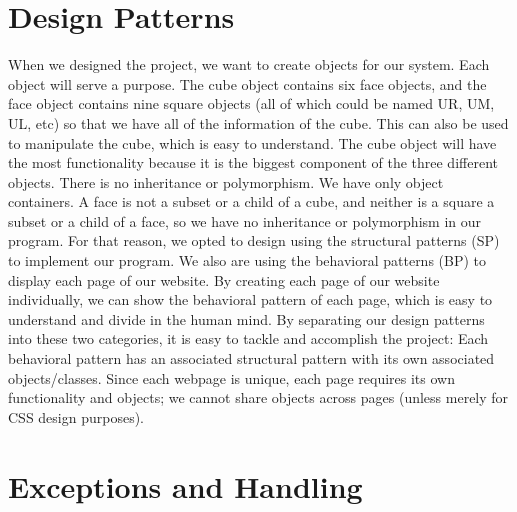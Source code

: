 \documentclass[12pt]{article}
\begin{document}
\section{Design Patterns}
\par
When we designed the project, we want to create objects for our system. Each object will serve a purpose. The cube object contains six face objects, and the face object contains nine square objects (all of which could be named UR, UM, UL, etc) so that we have all of the information of the cube. This can also be used to manipulate the cube, which is easy to understand. The cube object will have the most functionality because it is the biggest component of the three different objects. There is no inheritance or polymorphism. We have only object containers. A face is not a subset or a child of a cube, and neither is a square a subset or a child of a face, so we have no inheritance or polymorphism in our program. For that reason, we opted to design using the structural patterns (SP) to implement our program. We also are using the behavioral patterns (BP) to display each page of our website. By creating each page of our website individually, we can show the behavioral pattern of each page, which is easy to understand and divide in the human mind. By separating our design patterns into these two categories, it is easy to tackle and accomplish the project: Each behavioral pattern has an associated structural pattern with its own associated objects/classes. Since each webpage is unique, each page requires its own functionality and objects; we cannot share objects across pages (unless merely for CSS design purposes). \\

\section{Exceptions and Handling}
\end{document}
